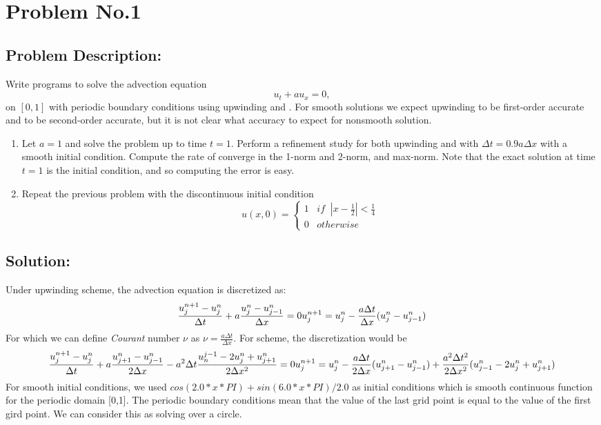 \section{Problem No.1} \label{sec:prob2}
\subsection{Problem Description:} 
Write programs to solve the advection equation 
$$
u_{t} + au_{x}=0,
$$
on $[0,1]$ with periodic boundary conditions using upwinding and \protect{\lw}. For smooth solutions we expect upwinding to be first-order accurate and \protect{\lw} to be second-order accurate, but it is not clear what accuracy to expect for nonsmooth solution.  
\begin{enumerate}
\item Let $a=1$ and solve the problem up to time $t=1$. Perform a refinement study for both upwinding and \protect{\lw} with $\Delta t=0.9a\Delta x$ with a smooth initial condition. Compute the rate of converge in the 1-norm and 2-norm, and max-norm. Note that the exact solution at time $t=1$ is the initial condition, and so computing the error is easy. 
\item Repeat the previous problem with the discontinuous initial condition 
$$
u(x,0) = \begin{cases}
         1\;\;\; if \;\;|x-\frac{1}{2}|<\frac{1}{4}\\
         0\;\;\; otherwise
         \end{cases}
$$
\end{enumerate}


\subsection{Solution:} 
Under upwinding scheme, the advection equation is discretized as:
$$
\frac{u_{j}^{n+1}-u_{j}^{n}}{\Delta t} + a\frac{u_{j}^{n}-u_{j-1}^{n}}{\Delta x}=0\\
u_{j}^{n+1} = u_{j}^{n} - \frac{a\Delta t}{\Delta x}(u_{j}^{n}-u_{j-1}^{n})
$$
For which we can define \emph{Courant} number $\nu$ as $\nu = \frac{a\Delta t}{\Delta x}$.  For \protect{\lw}  scheme, the discretization would be
$$
\frac{u_{j}^{n+1}-u_{j}^{n}}{\Delta t} + a \frac{u_{j+1}^{n} -u_{j-1}^{n}}{2\Delta x} - a^2\Delta t \frac{u_{n}^{j-1}-2u_{j}^{n}+u_{j+1}^{n}}{2 \Delta x^2}=0\\
u_{j}^{n+1} = u_{j}^{n} - \frac{a \Delta t}{2\Delta x}(u_{j+1}^{n}-u_{j-1}^{n})+\frac{a^2\Delta t^2}{2\Delta x^2}(u_{j-1}^{n}-2u_{j}^{n}+u_{j+1}^{n})
$$
For smooth initial conditions, we used $cos(2.0*x*PI) + sin(6.0*x*PI) / 2.0$ as initial conditions which is smooth continuous function for the periodic domain [0,1]. The periodic boundary conditions mean that the value of the last grid point is equal to the value of the first gird point. We can consider this as solving over a circle. 


